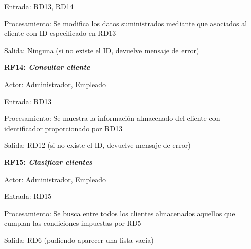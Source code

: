\documentclass[paper=a4, fontsize=11pt, spanish]{scrartcl}
\begin{document}
Entrada: RD13, RD14

Procesamiento: Se modifica los datos suministrados mediante que asociados al cliente con ID especificado en RD13

Salida: Ninguna (si no existe el ID, devuelve mensaje de error)

\setlength{\parindent}{0em}
\textbf{RF14: \textit{Consultar cliente}}
\setlength{\parindent}{2em}

Actor: Administrador, Empleado

Entrada: RD13

Procesamiento: Se muestra la información almacenado del cliente con identificador proporcionado por RD13

Salida:  RD12 (si no existe el ID, devuelve mensaje de error)

\setlength{\parindent}{0em}
\textbf{RF15: \textit{Clasificar clientes}}
\setlength{\parindent}{2em}

Actor: Administrador, Empleado

Entrada: RD15

Procesamiento:  Se busca entre todos los clientes almacenados aquellos que cumplan las condiciones impuestas por RD5

Salida: RD6 (pudiendo aparecer una lista vacia)
\end{document}
